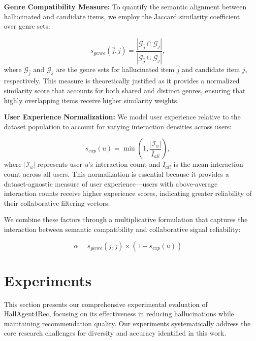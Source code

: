 \documentclass[acmsmall]{acmart}
\begin{document}
\textbf{Genre Compatibility Measure:} To quantify the semantic alignment between hallucinated and candidate items, we employ the Jaccard similarity coefficient over genre sets:

\begin{equation}
s_{genre}(\hat{j}, j) = \frac{|\mathcal{G}_{\hat{j}} \cap \mathcal{G}_j|}{|\mathcal{G}_{\hat{j}} \cup \mathcal{G}_j|},
\label{eq:genre_jaccard}
\end{equation}
where $\mathcal{G}_{\hat{j}}$ and $\mathcal{G}_j$ are the genre sets for hallucinated item $\hat{j}$ and candidate item $j$, respectively. This measure is theoretically justified as it provides a normalized similarity score that accounts for both shared and distinct genres, ensuring that highly overlapping items receive higher similarity weights.

\textbf{User Experience Normalization:} We model user experience relative to the dataset population to account for varying interaction densities across users:

\begin{equation}
s_{exp}(u) = \min\left(1, \frac{|\mathcal{I}_u|}{\bar{I}_{all}}\right),
\label{eq:experience_normalization}
\end{equation}
where $|\mathcal{I}_u|$ represents user $u$'s interaction count and $\bar{I}_{all}$ is the mean interaction count across all users. This normalization is essential because it provides a dataset-agnostic measure of user experience—users with above-average interaction counts receive higher experience scores, indicating greater reliability of their collaborative filtering vectors.

 We combine these factors through a multiplicative formulation that captures the interaction between semantic compatibility and collaborative signal reliability:

\begin{equation}
\alpha = s_{genre}(\hat{j}, j) \times (1 - s_{exp}(u))
\label{eq:theoretical_alpha}
\end{equation}

\section{Experiments}

This section presents our comprehensive experimental evaluation of HallAgent4Rec, focusing on its effectiveness in reducing hallucinations while maintaining recommendation quality. Our experiments systematically address the core research challenges for diversity and accuracy identified in this work.
\end{document}
